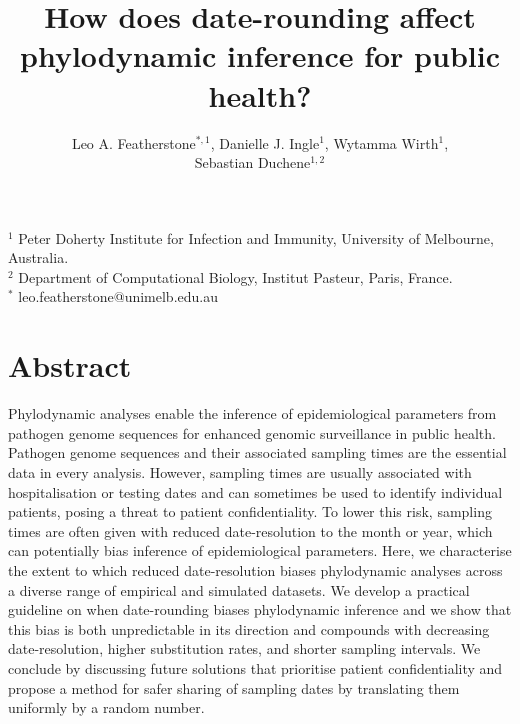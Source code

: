 \documentclass[12pt]{article}
\title{How does date-rounding affect phylodynamic inference for public health?}
\author{Leo A. Featherstone$^{\ast,1}$, Danielle J. Ingle$^{1}$, Wytamma Wirth$^{1}$,\\Sebastian Duchene$^{1,2}$}
\begin{document}
\maketitle

\section*{}
\footnotesize
$^{1}$ Peter Doherty Institute for Infection and Immunity, University of Melbourne, Australia.\\
$^{2}$ Department of Computational Biology, Institut Pasteur, Paris, France.\\
$^{*}$ leo.featherstone@unimelb.edu.au

\normalsize
\linenumbers

\section*{Abstract}
Phylodynamic analyses enable the inference of epidemiological parameters from pathogen genome sequences for enhanced genomic surveillance in public health. Pathogen genome sequences and their associated sampling times are the essential data in every analysis. However, sampling times are usually associated with hospitalisation or testing dates and can sometimes be used to identify individual patients, posing a threat to patient confidentiality. To lower this risk, sampling times are often given with reduced date-resolution to the month or year, which can potentially bias inference of epidemiological parameters. Here, we characterise the extent to which reduced date-resolution biases phylodynamic analyses across a diverse range of empirical and simulated datasets. We develop a practical guideline on when date-rounding biases phylodynamic inference and we show that this bias is both unpredictable in its direction and compounds with decreasing date-resolution, higher substitution rates, and shorter sampling intervals. We conclude by discussing future solutions that prioritise patient confidentiality and propose a method for safer sharing of sampling dates by translating them uniformly by a random number.
\end{document}
